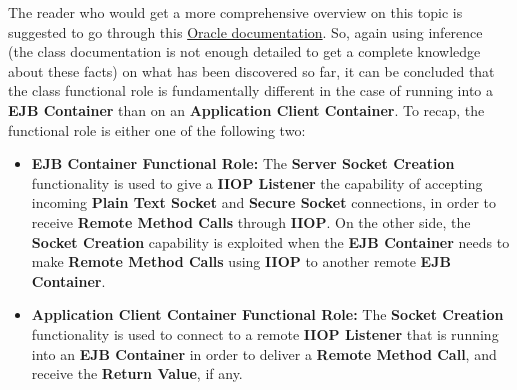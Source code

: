 The reader who would get a more comprehensive overview on this topic is suggested to go through this \href{https://docs.oracle.com/javaee/7/firstcup/java-ee002.htm}{Oracle documentation}.
So, again using inference (the class documentation is not enough detailed to get a complete knowledge about these facts) on what has been discovered so far, it can be concluded that the class functional role is fundamentally different in the case of running into a \textbf{EJB Container} than on an \textbf{Application Client Container}.
To recap, the functional role is either one of the following two:
\begin{itemize}
	\item \textbf{EJB Container Functional Role:}
		The \textbf{Server Socket Creation} functionality is used to give a \textbf{IIOP Listener} the capability of accepting incoming \textbf{Plain Text Socket} and \textbf{Secure Socket} connections, in order to receive \textbf{Remote Method Calls} through \textbf{IIOP}.
		On the other side, the \textbf{Socket Creation} capability is exploited when the \textbf{EJB Container} needs to make \textbf{Remote Method Calls} using \textbf{IIOP} to another remote \textbf{EJB Container}.
	\item \textbf{Application Client Container Functional Role:}
		The \textbf{Socket Creation} functionality is used to connect to a remote \textbf{IIOP Listener} that is running into an \textbf{EJB Container} in order to deliver a \textbf{Remote Method Call}, and receive the \textbf{Return Value}, if any.
\end{itemize}

